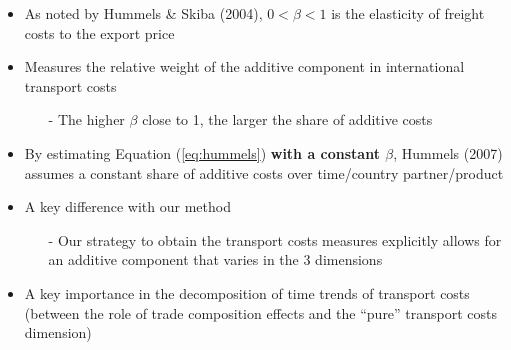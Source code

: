 \documentclass[10 pt,Helvetica, french]{beamer}
\begin{document}
\begin{frame}
\begin{itemize}
\item As noted by Hummels \& Skiba (2004), $0<\beta<1$ is the elasticity of freight costs to the export price \vspace{0.1cm}
\item Measures the relative weight of the additive component in international transport costs \vspace{0.1cm}
\begin{itemize}
\item[-] The higher $\beta$ close to 1, the larger the share of additive costs \vspace{0.1cm}
\end{itemize}
\item By estimating Equation (\ref{eq:hummels}) \textbf{with a constant $\beta$}, Hummels (2007) assumes a constant share of additive costs over time/country partner/product \vspace{0.1cm}
\item A key difference with our method \vspace{0.1cm}
\begin{itemize}
\item[-] Our strategy to obtain the transport costs measures explicitly allows for an additive component that varies in the 3 dimensions \vspace{0.1cm}
\end{itemize}
\item A key importance in the decomposition of time trends of transport costs (between the role of trade composition effects and the ``pure'' transport costs dimension)
\end{itemize}
\hyperlink{slide_compeffects_strategy}{}
\end{frame}
\end{document}

